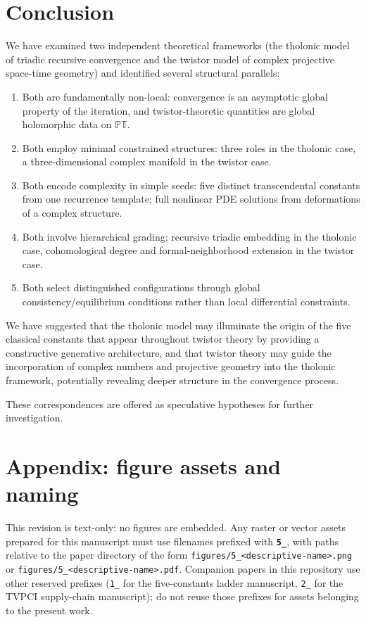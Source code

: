 \documentclass[12pt]{article}
\providecommand{\tightlist}{%
  \setlength{\itemsep}{0pt}\setlength{\parskip}{0pt}}
\begin{document}
\section{Conclusion}\label{conclusion}

We have examined two independent theoretical frameworks (the tholonic
model of triadic recursive convergence and the twistor model of complex
projective space-time geometry) and identified several structural
parallels:

\begin{enumerate}
\def\labelenumi{\arabic{enumi}.}
\tightlist
\item
  Both are fundamentally non-local: convergence is an asymptotic global
  property of the iteration, and twistor-theoretic quantities are global
  holomorphic data on \(\mathbb{PT}\).
\item
  Both employ minimal constrained structures: three roles in the
  tholonic case, a three-dimensional complex manifold in the twistor
  case.
\item
  Both encode complexity in simple seeds: five distinct transcendental
  constants from one recurrence template; full nonlinear PDE solutions
  from deformations of a complex structure.
\item
  Both involve hierarchical grading: recursive triadic embedding in the
  tholonic case, cohomological degree and formal-neighborhood extension
  in the twistor case.
\item
  Both select distinguished configurations through global
  consistency/equilibrium conditions rather than local differential
  constraints.
\end{enumerate}

We have suggested that the tholonic model may illuminate the origin of
the five classical constants that appear throughout twistor theory by
providing a constructive generative architecture, and that twistor
theory may guide the incorporation of complex numbers and projective
geometry into the tholonic framework, potentially revealing deeper
structure in the convergence process.

These correspondences are offered as speculative hypotheses for further
investigation.

\section{Appendix: figure assets and
naming}\label{appendix-figure-assets-and-naming}

This revision is text-only: no figures are embedded. Any raster or
vector assets prepared for this manuscript must use filenames prefixed
with \textbf{\texttt{5\_}}, with paths relative to the paper directory
of the form
\texttt{figures/5\_\textless{}descriptive-name\textgreater{}.png} or
\texttt{figures/5\_\textless{}descriptive-name\textgreater{}.pdf}.
Companion papers in this repository use other reserved prefixes
(\texttt{1\_} for the five-constants ladder manuscript, \texttt{2\_} for
the TVPCI supply-chain manuscript); do not reuse those prefixes for
assets belonging to the present work.
\end{document}
